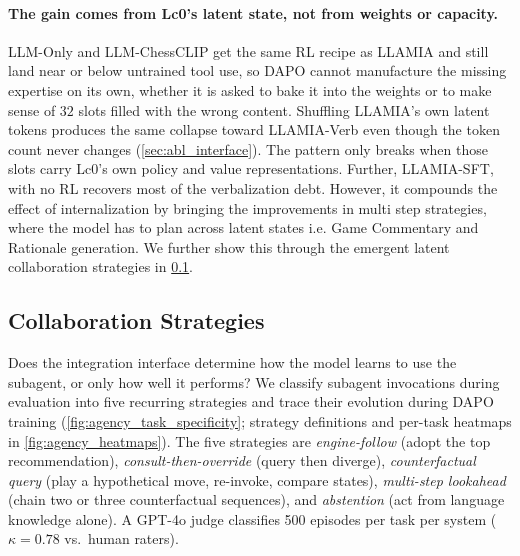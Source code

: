 \paragraph{The gain comes from Lc0's latent state, not from weights or capacity.}
LLM-Only and LLM-ChessCLIP get the same RL recipe as LLAMIA and still land near or below untrained tool use, so DAPO cannot manufacture the missing expertise on its own, whether it is asked to bake it into the weights or to make sense of $32$ slots filled with the wrong content. Shuffling LLAMIA's own latent tokens produces the same collapse toward LLAMIA-Verb even though the token count never changes (\cref{sec:abl_interface}). The pattern only breaks when those slots carry Lc0's own policy and value representations. Further, LLAMIA-SFT, with no RL recovers most of the verbalization debt. However, it compounds the effect of internalization by bringing the improvements in multi step strategies, where the model has to plan across latent states i.e. Game Commentary and Rationale generation. We further show this through the emergent latent collaboration strategies in \cref{sec:results_agency}.

\subsection{Collaboration Strategies}
\label{sec:results_agency}
Does the integration interface determine how the model learns to use the subagent, or only how well it performs? We classify subagent invocations during evaluation into five recurring strategies and trace their evolution during DAPO training (\cref{fig:agency_task_specificity}; strategy definitions and per-task heatmaps in \cref{fig:agency_heatmaps}). The five strategies are \emph{engine-follow} (adopt the top recommendation), \emph{consult-then-override} (query then diverge), \emph{counterfactual query} (play a hypothetical move, re-invoke, compare states), \emph{multi-step lookahead} (chain two or three counterfactual sequences), and \emph{abstention} (act from language knowledge alone). A GPT-4o judge classifies 500 episodes per task per system ($\kappa{=}0.78$ vs.\ human raters).

